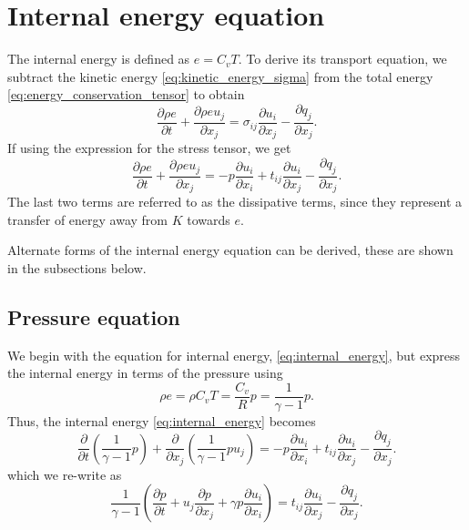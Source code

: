 \documentclass[oneside,a4paper,11pt]{report}
\begin{document}
\section{Internal energy equation}
\label{sec:alternate_forms_internal_energy_equation}
The internal energy is defined as $e = C_v T$. To derive its transport equation, we subtract the kinetic energy \cref{eq:kinetic_energy_sigma} from the total energy \cref{eq:energy_conservation_tensor} to obtain
\begin{equation}
    \label{eq:internal_energy_sigma}
    \frac{ \partial \rho e}{\partial t} + \frac{\partial \rho e u_j}{\partial x_j} = \sigma_{ij} \frac{\partial u_i}{\partial x_j} - \frac{\partial q_j}{\partial x_j}.
\end{equation}
If using the expression for the stress tensor, we get
\begin{equation}
    \label{eq:internal_energy}
    \frac{ \partial \rho e}{\partial t} + \frac{\partial \rho e u_j}{\partial x_j} = - p \frac{\partial u_i}{\partial x_i} + t_{ij} \frac{\partial u_i}{\partial x_j} - \frac{\partial q_j}{\partial x_j}.
\end{equation}
The last two terms are referred to as the dissipative terms, since they represent a transfer of energy away from $K$ towards $e$.

Alternate forms of the internal energy equation can be derived, these are shown in the subsections below.
\subsection{Pressure equation} 
We begin with the equation for internal energy, \cref{eq:internal_energy}, but express the internal energy in terms of the pressure using 
\begin{equation}
\rho e = \rho C_v T = \frac{C_v}{R} p = \frac{1}{\gamma - 1} p.
\end{equation}
Thus, the internal energy \cref{eq:internal_energy} becomes
\begin{equation}
\frac{ \partial}{\partial t} \left ( \frac{1}{\gamma - 1} p \right ) + \frac{\partial}{\partial x_j} \left ( \frac{1}{\gamma - 1} p u_j \right ) = - p \frac{\partial u_i}{\partial x_i} + t_{ij} \frac{\partial u_i}{\partial x_j} - \frac{\partial q_j}{\partial x_j}.
\end{equation}
which we re-write as
\begin{equation}
\label{eq:energy_form_pressure}
\frac{1}{\gamma - 1} \left ( \frac{ \partial p}{\partial t}  + u_j\frac{\partial p}{\partial x_j} + \gamma p \frac{\partial u_i}{\partial x_i} \right ) =  t_{ij} \frac{\partial u_i}{\partial x_j} - \frac{\partial q_j}{\partial x_j}.
\end{equation}
\end{document}
